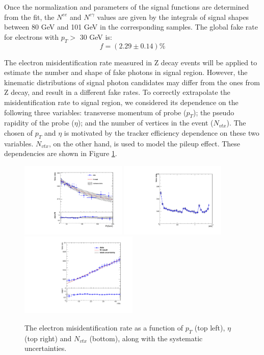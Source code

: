 \documentclass[thesis.tex]{subfiles}
\renewcommand\_{\textunderscore\allowbreak}
\begin{document}
Once the normalization and parameters of the signal functions are determined from the fit, the $N^{ee}$ and $N^{e\gamma}$ values are given by the integrals of signal shapes between 80 GeV and 101 GeV in the corresponding samples. The global fake rate for electrons with $p_T >$ 30 GeV is: 
\begin{equation}
        f = (2.29 \pm 0.14)\%
\end{equation}

The electron misidentification rate measured in Z decay events will be applied to estimate the number and shape of fake photons in signal region. However, the kinematic distributions of signal photon candidates may differ from the ones from Z decay, and result in a different fake rates. To correctly extrapolate the misidentification rate to signal region, we considered its dependence on the following three variables: transverse momentum of probe ($p_T$); the pseudo rapidity of the probe ($\eta$); and the number of vertices in the event ($N_{vtx}$). The chosen of $p_T$ and $\eta$ is motivated by the tracker efficiency dependence on these two variables. $N_{vtx}$, on the other hand, is used to model the pileup effect. These dependencies are shown in Figure \ref{fig:elefakepho_rate_pt}.


\begin{figure}[hbtp]
  \centering
    \includegraphics[width=0.45\textwidth]{Figures/elefake_pt_systematic_data.pdf}
    \includegraphics[width=0.45\textwidth]{Figures/elefake_eta_systematic_data.pdf}
     \includegraphics[width=0.5\textwidth]{Figures/elefake_vtx_systematic.pdf}
  \caption{The electron misidentification rate as a function of $p_T$ (top left), $\eta$ (top right) and $N_{vtx}$ (bottom), along with the systematic uncertainties.}
  \label{fig:elefakepho_rate_pt}
\end{figure}
\end{document}
